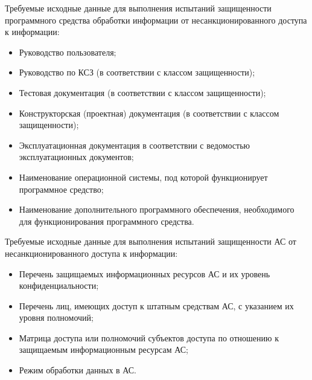 Требуемые исходные данные для выполнения испытаний защищенности программного средства обработки информации от несанкционированного доступа к информации:

\begin{itemize}
	\item Руководство пользователя;
	\item Руководство по КСЗ (в соответствии с классом защищенности);
	\item Тестовая документация (в соответствии с классом защищенности);
	\item Конструкторская (проектная) документация (в соответствии с классом защищенности);
	\item Эксплуатационная документация в соответствии с ведомостью эксплуатационных документов;
	\item Наименование операционной системы, под которой функционирует программное средство;
	\item Наименование дополнительного программного обеспечения, необходимого для функционирования программного средства.
\end{itemize}

Требуемые исходные данные для выполнения испытаний защищенности
 АС от несанкционированного доступа к информации:
 
 \begin{itemize}
 	\item Перечень защищаемых информационных ресурсов АС и их уровень конфиденциальности;
 	\item Перечень лиц, имеющих доступ к штатным средствам АС, с указанием их уровня полномочий;
 	\item Матрица доступа или полномочий субъектов доступа по отношению к защищаемым информационным ресурсам АС;
 	\item Режим обработки данных в АС.
 \end{itemize}